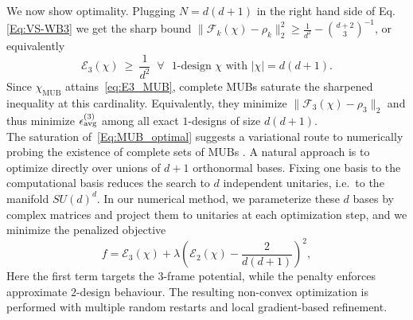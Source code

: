 \documentclass[aps,twocolumn,pra,superscriptaddress,nofootinbib]{revtex4-2}
\begin{document}
We now show optimality. {Plugging $N=d(d+1)$ in the right hand side of Eq.\eqref{Eq:VS-WB3} we get the sharp bound $ \|\mathcal F_k(\chi)-\rho_k\|_2^2 \geq \frac{1}{d^2}-\binom{d+2}{3}^{-1}$,
or equivalently 
\begin{equation}\label{Eq:MUB_optimal}
   \mathcal{E}_3(\chi)\ \ge\ \frac{1}{d^2}
 \;\; \forall
 \text{ $1$-design $\chi$ with $|\chi|=d(d+1)$.}
\end{equation} }
Since $\chi_{\mathrm{MUB}}$ attains~\eqref{eq:E3_MUB}, complete MUBs saturate the sharpened inequality at this
cardinality. Equivalently, they minimize $\|\mathcal F_3(\chi)-\rho_3\|_2$ and thus minimize
$\epsilon^{(3)}_{\rm avg}$ among all exact $1$-designs of size $d(d+1)$.\\

The saturation of~\eqref{Eq:MUB_optimal} suggests a variational route to numerically probing the existence of complete sets of MUBs \cite{Durt2010}. A natural approach is to optimize directly over unions of $d+1$ orthonormal bases. Fixing one basis to the computational basis reduces the search to $d$ independent unitaries, i.e.\ to the manifold $SU(d)^d$. In our numerical method, we parameterize these $d$ bases by complex matrices and project them to unitaries at each optimization step, and we minimize the penalized objective
\begin{equation}
f=\mathcal{E}_3(\chi)+\lambda\!\left(\mathcal{E}_2(\chi)-\frac{2}{d(d+1)}\right)^2,
\end{equation}
Here the first term targets the 3-frame potential, while the penalty enforces approximate $2$-design behaviour. The resulting non-convex optimization is performed with multiple random restarts and local gradient-based refinement.
\end{document}
